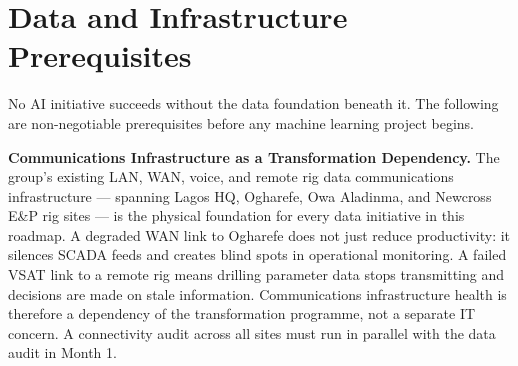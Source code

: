 \documentclass[10pt]{article}
\begin{document}
\vspace{10pt}

\section{Data and Infrastructure Prerequisites}

{\small
No AI initiative succeeds without the data foundation beneath it.
The following are non-negotiable prerequisites before any machine learning
project begins.
}

\vspace{4pt}
\noindent\colorbox{primary!8}{%
\begin{minipage}{\dimexpr\textwidth-2\fboxsep}
  \vspace{5pt}
  \textbf{\color{primary}Communications Infrastructure as a Transformation Dependency.}\quad
  The group's existing LAN, WAN, voice, and remote rig data communications
  infrastructure --- spanning Lagos HQ, Ogharefe, Owa Aladinma, and Newcross
  E\&P rig sites --- is the physical foundation for every data initiative in
  this roadmap. A degraded WAN link to Ogharefe does not just reduce
  productivity: it silences SCADA feeds and creates blind spots in operational
  monitoring. A failed VSAT link to a remote rig means drilling parameter data
  stops transmitting and decisions are made on stale information. Communications
  infrastructure health is therefore a dependency of the transformation
  programme, not a separate IT concern. A connectivity audit across all sites
  must run in parallel with the data audit in Month 1.
  \vspace{5pt}
\end{minipage}}
\end{document}
